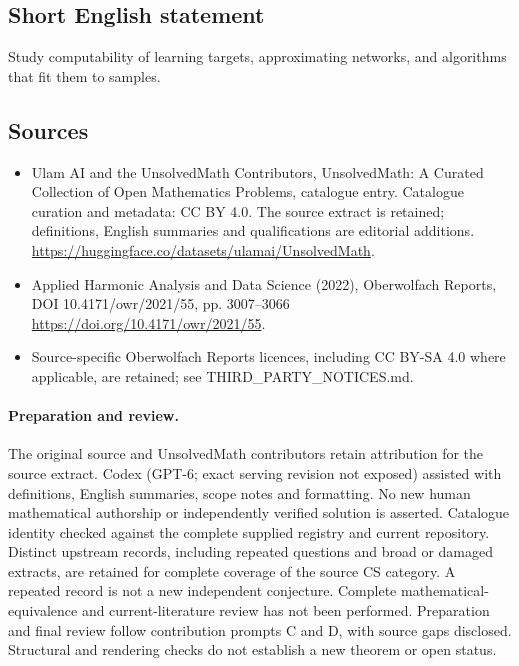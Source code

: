 \documentclass[11pt]{article}
\begin{document}
\subsection{Short English statement}
Study computability of learning targets, approximating networks, and algorithms that fit them to samples.
\subsection{Sources}
\begin{itemize}
\item[\hypertarget{source:statement:1}{S1}] Ulam AI and the UnsolvedMath Contributors, UnsolvedMath: A Curated Collection of Open Mathematics Problems, catalogue entry. Catalogue curation and metadata: CC BY 4.0. The source extract is retained; definitions, English summaries and qualifications are editorial additions.
\url{https://huggingface.co/datasets/ulamai/UnsolvedMath}.
\item[\hypertarget{source:statement:2}{S2}] Applied Harmonic Analysis and Data Science (2022), Oberwolfach Reports, DOI 10.4171/owr/2021/55, pp. 3007--3066
\url{https://doi.org/10.4171/owr/2021/55}.
\item Source-specific Oberwolfach Reports licences, including CC BY-SA 4.0 where applicable, are retained; see THIRD\_PARTY\_NOTICES.md.
\end{itemize}
\paragraph{Preparation and review.}
The original source and UnsolvedMath contributors retain attribution for the source extract. Codex (GPT-6; exact serving revision not exposed) assisted with definitions, English summaries, scope notes and formatting. No new human mathematical authorship or independently verified solution is asserted. Catalogue identity checked against the complete supplied registry and current repository. Distinct upstream records, including repeated questions and broad or damaged extracts, are retained for complete coverage of the source CS category. A repeated record is not a new independent conjecture. Complete mathematical-equivalence and current-literature review has not been performed. Preparation and final review follow contribution prompts C and D, with source gaps disclosed. Structural and rendering checks do not establish a new theorem or open status.
\label{end:statement}
\end{document}
